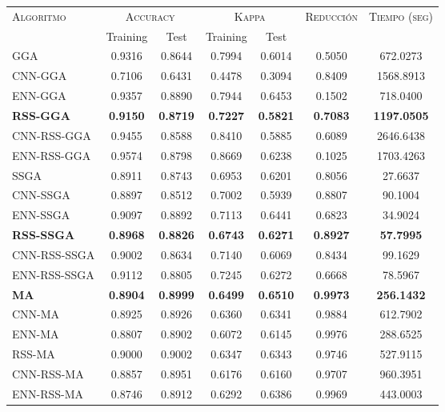 \begin{table}[h!]
\centering
\begin{tabular}{l c c c c c c}
\hline
\multirow{2}{*}{\textsc{Algoritmo}}
	& \multicolumn{2}{c}{\textsc{Accuracy}}
	& \multicolumn{2}{c}{\textsc{Kappa}}
	& \textsc{Reducción}
	& \textsc{Tiempo (seg)} \\
	& Training & Test
	& Training & Test \\ 
\hline
\hline

GGA         & 0.9316 & 0.8644 & 0.7994 & 0.6014 & 0.5050 & 672.0273 \\
CNN-GGA     & 0.7106 & 0.6431 & 0.4478 & 0.3094 & 0.8409 & 1568.8913 \\
ENN-GGA     & 0.9357 & 0.8890 & 0.7944 & 0.6453 & 0.1502 & 718.0400 \\
\textbf{RSS-GGA}     & \textbf{0.9150} & \textbf{0.8719} & \textbf{0.7227} & \textbf{0.5821} & \textbf{0.7083} & \textbf{1197.0505} \\
CNN-RSS-GGA & 0.9455 & 0.8588 & 0.8410 & 0.5885 & 0.6089 & 2646.6438 \\
ENN-RSS-GGA & 0.9574 & 0.8798 & 0.8669 & 0.6238 & 0.1025 & 1703.4263 \\

\hline

SSGA & 0.8911 & 0.8743 & 0.6953 & 0.6201 & 0.8056 & 27.6637 \\
CNN-SSGA & 0.8897 & 0.8512 & 0.7002 & 0.5939 & 0.8807 & 90.1004 \\
ENN-SSGA & 0.9097 & 0.8892 & 0.7113 & 0.6441 & 0.6823 & 34.9024 \\
\textbf{RSS-SSGA} & \textbf{0.8968} & \textbf{0.8826} & \textbf{0.6743} & \textbf{0.6271} & \textbf{0.8927} & \textbf{57.7995} \\
CNN-RSS-SSGA & 0.9002 & 0.8634 & 0.7140 & 0.6069 & 0.8434 & 99.1629 \\
ENN-RSS-SSGA & 0.9112 & 0.8805 & 0.7245 & 0.6272 & 0.6668 & 78.5967 \\

\hline

\textbf{MA}   & \textbf{0.8904} & \textbf{0.8999} & \textbf{0.6499} & \textbf{0.6510} & \textbf{0.9973} & \textbf{256.1432} \\
CNN-MA & 0.8925 & 0.8926 & 0.6360 & 0.6341 & 0.9884 & 612.7902 \\
ENN-MA & 0.8807 & 0.8902 & 0.6072 & 0.6145 & 0.9976 & 288.6525 \\
RSS-MA & 0.9000 & 0.9002 & 0.6347 & 0.6343 & 0.9746 & 527.9115 \\
CNN-RSS-MA & 0.8857 & 0.8951 & 0.6176 & 0.6160 & 0.9707 & 960.3951 \\
ENN-RSS-MA & 0.8746 & 0.8912 & 0.6292 & 0.6386 & 0.9969 & 443.0003 \\


\end{tabular}
\end{table}
